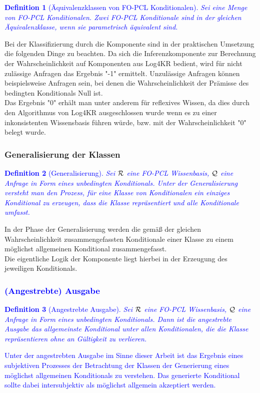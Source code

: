 \documentclass[a4paper, 11pt]{book}
\newtheorem{Def}{Definition }[section]
\begin{document}
\textcolor{blue}{
	\begin{Def}[Äquivalenzklassen von FO-PCL Konditionalen] \label{Äquivalenzklassen} 
		Sei  eine Menge von FO-PCL Konditionalen. Zwei FO-PCL Konditionale sind in der gleichen Äquivalenzklasse, wenn sie parametrisch äquivalent sind. 
	\end{Def}
}


Bei der Klassifizierung durch die Komponente sind in der praktischen Umsetzung die folgenden Dinge zu beachten. 
Da sich die Inferenzkomponente zur Berechnung der Wahrscheinlichkeit auf Komponenten aus Log4KR bedient, wird für nicht zulässige Anfragen das Ergebnis "{}-1"{} ermittelt. Unzulässige Anfragen können beispielsweise Anfragen sein, bei denen die Wahrscheinlichkeit der Prämisse des bedingten Konditionals Null ist.\\
Das Ergebnis  "{}0"{} erhält man unter anderem für reflexives Wissen, da dies durch den Algorithmus von Log4KR ausgeschlossen wurde wenn es zu einer inkonsistenten Wissensbasis führen würde, bzw. mit der Wahrscheinlichkeit  "{}0"{} belegt wurde. 
	
	
	
	
\subsubsection{Generalisierung der Klassen}
\textcolor{blue}{
\begin{Def}[Generalisierung] \label{Generalisierung}
	Sei $\cal{R}$ eine FO-PCL Wissenbasis, $ \cal{Q} $ eine Anfrage in Form eines unbedingten Konditionals. Unter der Generalisierung versteht man den Prozess, für eine Klasse von Konditionalen ein einziges Konditional zu erzeugen, dass die Klasse repräsentiert und alle Konditionale umfasst. 
\end{Def}
}
In der Phase der Generalisierung werden die gemäß der gleichen Wahrscheinlichkeit zusammengefassten Konditionale einer Klasse zu einem möglichst allgemeinen Konditional zusammengefasst.\\
Die eigentliche Logik der Komponente liegt hierbei in der Erzeugung des jeweiligen Konditionals.

\textcolor{blue}{
\subsubsection{(Angestrebte) Ausgabe} 
	\begin{Def}[Angestrebte Ausgabe]  \label{angestrebte Ausgabe}
		Sei $\cal{R}$ eine FO-PCL Wissenbasis,  $ \cal{Q} $ eine Anfrage in Form eines unbedingten Konditionals. Dann ist die angestrebte Ausgabe das allgemeinste Konditional unter allen Konditionalen, die die Klasse repräsentieren ohne an Gültigkeit zu verlieren.
	\end{Def}
}
\textcolor{blue}{
	Unter der angestrebten Ausgabe im Sinne dieser Arbeit ist das Ergebnis eines subjektiven Prozesses der Betrachtung der Klassen der Generierung eines möglichst allgemeinen Konditionals zu verstehen. Das generierte Konditional sollte dabei intersubjektiv als möglichst allgemein akzeptiert werden.}
\end{document}
